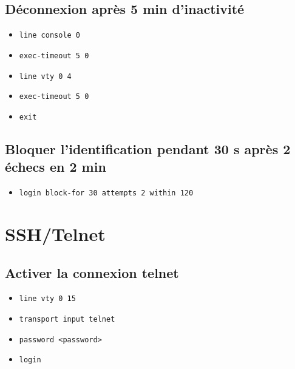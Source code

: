 \documentclass[a4paper]{article}
\begin{document}
\subsection{Déconnexion après 5 min d'inactivité}



\begin{itemize}[label=\textbf{–}]
    \item \texttt{line console 0}
    \item \texttt{exec-timeout 5 0}
    \item \texttt{line vty 0 4}
    \item \texttt{exec-timeout 5 0}
    \item \texttt{exit}
\end{itemize}





\subsection{Bloquer l’identification pendant 30 s après 2 échecs en 2 min}



\begin{itemize}[label=\textbf{–}]
    \item \texttt{login block-for 30 attempts 2 within 120}
\end{itemize}










\section{SSH/Telnet}










\subsection{Activer la connexion telnet}



\begin{itemize}[label=\textbf{–}]
    \item \texttt{line vty 0 15}
    \item \texttt{transport input telnet}
    \item \texttt{password <password>}
    \item \texttt{login}
\end{itemize}
\end{document}
